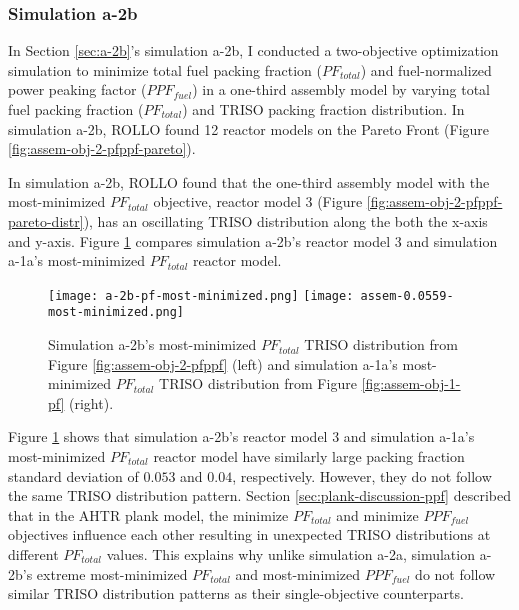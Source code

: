 \subsubsection{Simulation a-2b}
In Section \ref{sec:a-2b}'s simulation a-2b, I conducted a two-objective 
optimization simulation to minimize total fuel packing fraction ($PF_{total}$) and 
fuel-normalized power peaking factor ($PPF_{fuel}$) in a one-third assembly model 
by varying total fuel packing fraction ($PF_{total}$) and TRISO packing fraction 
distribution. 
In simulation a-2b, ROLLO found 12 reactor models on the Pareto Front (Figure 
\ref{fig:assem-obj-2-pfppf-pareto}). 

In simulation a-2b, \gls{ROLLO} found that the one-third assembly model with the 
most-minimized $PF_{total}$ objective, reactor model 3 (Figure 
\ref{fig:assem-obj-2-pfppf-pareto-distr}), has an oscillating TRISO distribution 
along the both the x-axis and y-axis. 
Figure \ref{fig:a-2b-pf-triso-comparison} compares simulation a-2b's reactor model 3 and 
simulation a-1a's most-minimized $PF_{total}$ reactor model. 
\begin{figure}[htbp!]
    \centering
    \texttt{[image: a-2b-pf-most-minimized.png]} 
    \texttt{[image: assem-0.0559-most-minimized.png]} 
    \caption{Simulation a-2b's most-minimized $PF_{total}$ TRISO distribution 
    from Figure \ref{fig:assem-obj-2-pfppf} (left) and simulation a-1a's 
    most-minimized $PF_{total}$ TRISO distribution from Figure 
    \ref{fig:assem-obj-1-pf} (right).}
    \label{fig:a-2b-pf-triso-comparison}
\end{figure}
Figure \ref{fig:a-2b-pf-triso-comparison} shows that simulation a-2b's reactor model 3 
and simulation a-1a's most-minimized $PF_{total}$ reactor model have similarly large 
packing fraction standard deviation of $0.053$ and $0.04$, respectively. 
However, they do not follow the same TRISO distribution pattern. 
Section \ref{sec:plank-discussion-ppf} described that in the \gls{AHTR} plank model, 
the minimize $PF_{total}$ and minimize $PPF_{fuel}$ objectives influence each other
resulting in unexpected TRISO distributions at different $PF_{total}$ values.
This explains why unlike simulation a-2a, simulation a-2b's extreme most-minimized 
$PF_{total}$ and most-minimized $PPF_{fuel}$ do not follow similar TRISO distribution 
patterns as their single-objective counterparts.

